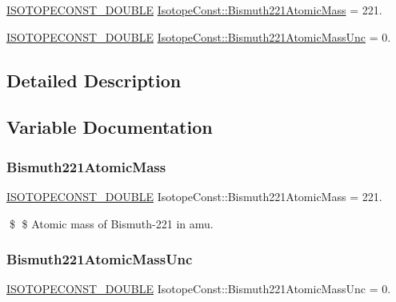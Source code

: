 \begin{DoxyCompactItemize}
\item 
\mbox{\hyperlink{group___isotope_const-_macros_ga8f45a7272ce02c0b4c65c44636ed719a}{I\+S\+O\+T\+O\+P\+E\+C\+O\+N\+S\+T\+\_\+\+D\+O\+U\+B\+LE}} \mbox{\hyperlink{group___isotope_const-_bismuth-_bi221_gaa00bd180f41a1b222a38194a26f4cc97}{Isotope\+Const\+::\+Bismuth221\+Atomic\+Mass}} = 221.
\item 
\mbox{\hyperlink{group___isotope_const-_macros_ga8f45a7272ce02c0b4c65c44636ed719a}{I\+S\+O\+T\+O\+P\+E\+C\+O\+N\+S\+T\+\_\+\+D\+O\+U\+B\+LE}} \mbox{\hyperlink{group___isotope_const-_bismuth-_bi221_ga95712ee0205e1e2f26d022a3958d81ee}{Isotope\+Const\+::\+Bismuth221\+Atomic\+Mass\+Unc}} = 0.
\end{DoxyCompactItemize}


\subsection{Detailed Description}


\subsection{Variable Documentation}
\mbox{\label{group___isotope_const-_bismuth-_bi221_gaa00bd180f41a1b222a38194a26f4cc97}} 
\subsubsection{\texorpdfstring{Bismuth221\+Atomic\+Mass}{Bismuth221AtomicMass}}
{\footnotesize\ttfamily \mbox{\hyperlink{group___isotope_const-_macros_ga8f45a7272ce02c0b4c65c44636ed719a}{I\+S\+O\+T\+O\+P\+E\+C\+O\+N\+S\+T\+\_\+\+D\+O\+U\+B\+LE}} Isotope\+Const\+::\+Bismuth221\+Atomic\+Mass = 221.}

\$ \$ Atomic mass of Bismuth-\/221 in amu. \mbox{\label{group___isotope_const-_bismuth-_bi221_ga95712ee0205e1e2f26d022a3958d81ee}} 
\subsubsection{\texorpdfstring{Bismuth221\+Atomic\+Mass\+Unc}{Bismuth221AtomicMassUnc}}
{\footnotesize\ttfamily \mbox{\hyperlink{group___isotope_const-_macros_ga8f45a7272ce02c0b4c65c44636ed719a}{I\+S\+O\+T\+O\+P\+E\+C\+O\+N\+S\+T\+\_\+\+D\+O\+U\+B\+LE}} Isotope\+Const\+::\+Bismuth221\+Atomic\+Mass\+Unc = 0.}

